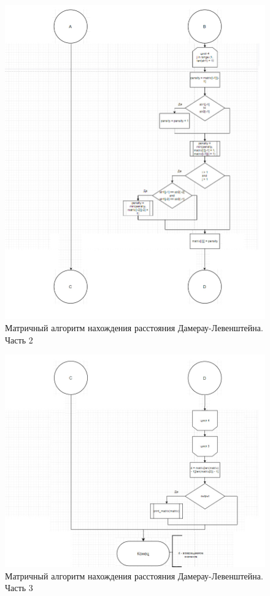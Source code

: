 \documentclass[a4paper,12pt]{report}
\begin{document}
\begin{center}
		\newpage
		\begin{figure}[h!]
			\includegraphics[width=1\linewidth]{lev_mat_end1.jpg}
			\caption{Матричный алгоритм нахождения расстояния Дамерау-Левенштейна. Часть 2}
			\label{ris:matLevD2}
		\end{figure}
		
		\newpage
		\begin{figure}[h!]
			\includegraphics[width=1\linewidth]{lev_mat_end2.jpg}
			\caption{Матричный алгоритм нахождения расстояния Дамерау-Левенштейна. Часть 3}
			\label{ris:matLevD3}
		\end{figure}
		

\end{center}
\end{document}
